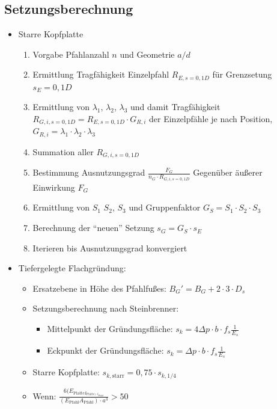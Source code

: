 \documentclass[fleqn,twoside]{article}
\begin{document}
\subsection{Setzungsberechnung}

\begin{itemize}
    \item Starre Kopfplatte
    \begin{enumerate}
        \item Vorgabe Pfahlanzahl $n$ und Geometrie $a/d$
        \item Ermittlung Tragfähigkeit Einzelpfahl $R_{E,s=0,1D}$ für Grenzsetung $s_E=0,1D$
        \item Ermittlung von $\lambda_1$, $\lambda_2$, $\lambda_3$ und damit Tragfähigkeit $R_{G,i,s=0,1D}=R_{E,s=0,1D}\cdot G_{R,i}$ der Einzelpfähle je nach Position, $G_{R,i}=\lambda_1\cdot\lambda_2\cdot\lambda_3$
        \item Summation aller $R_{G,i,s=0,1D}$
        \item Bestimmung Ausnutzungsgrad $\frac{F_G}{n_G\cdot R_{G,i,s=0,1D}}$ Gegenüber äußerer Einwirkung $F_G$
        \item Ermittlung von $S_1$ $S_2$, $S_3$ und Gruppenfaktor $G_S=S_1\cdot S_2\cdot S_3$
        \item Berechnung der \enquote{neuen} Setzung $s_G=G_S\cdot s_E$
        \item Iterieren bis Ausnutzungsgrad konvergiert
    \end{enumerate}
    \item Tiefergelegte Flachgründung:
    \begin{itemize}
        \item Ersatzebene in Höhe des Pfahlfußes: $B_G'=B_G+2\cdot3\cdot D_s$
        \item Setzungsberechnung nach Steinbrenner:
        \begin{itemize}
            \item Mittelpunkt der Gründungsfläche: $s_k=4\Delta p\cdot b\cdot f_s\frac{1}{E_s}$
        \end{itemize}
        \begin{itemize}
            \item Eckpunkt der Gründungsfläche: $s_k=\Delta p\cdot b\cdot f_s\frac{1}{E_s}$
        \end{itemize}
        \item Starre Kopfplatte: $s_{k,\text{starr}}=0,75\cdot s_{k,1/4}$
       \item Wenn: $\frac{6(E_{\text{Platte}I_{\text{Platte})\cdot l_{\text{Pfahl}}}}}{(E_{\text{Pfahl}}A_{\text{Pfahl}})\cdot a^3}>50$
    \end{itemize}
\end{itemize}
\end{document}

